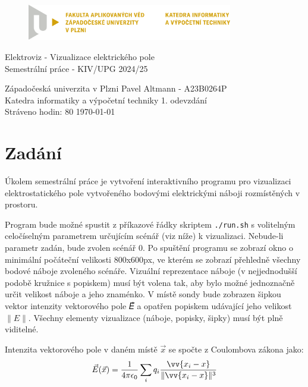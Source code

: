 \documentclass[12pt]{article}
\newcommand{\code}[1]{\texttt{#1}}
\begin{document}
\begin{figure}[H]
	\centering
	\includegraphics[width=0.8\textwidth]{pic/kiv-cmyk-cz}
\end{figure}

\begin{center}
	\vspace{.5cm}
	\LARGE{Elektroviz - Vizualizace elektrického pole}\\
	\large{Semestrální práce - KIV/UPG 2024/25}
\end{center}

\vfill

\noindent
Západočeská univerzita v Plzni \hfill Pavel Altmann - A23B0264P\\
Katedra informatiky a výpočetní techniky \hfill 1. odevzdání\\
Stráveno hodin: 80 \hfill \today
\thispagestyle{empty}

\newpage
\setcounter{page}{1}

\tableofcontents

\newpage

\section{Zadání}

Úkolem semestrální práce je vytvoření interaktivního programu pro vizualizaci
elektrostatického pole vytvořeného bodovými elektrickými náboji rozmístěných v
prostoru.

Program bude možné spustit z příkazové řádky skriptem \code{./run.sh} s
volitelným celočíselným parametrem určujícím scénář (viz níže) k vizualizaci.
Nebude-li parametr zadán, bude zvolen scénář 0. Po spuštění programu se zobrazí
okno o minimální počáteční velikosti 800x600px, ve kterém se zobrazí přehledně
všechny bodové náboje zvoleného scénáře. Vizuální reprezentace náboje (v
nejjednodušší podobě kružnice s popiskem) musí být volena tak, aby bylo možné
jednoznačně určit velikost náboje a jeho znaménko. V místě sondy bude zobrazen
šipkou vektor intenzity vektorového pole 𝐸⃗ a opatřen popiskem udávající jeho
velikost $\|E\|$. Všechny elementy vizualizace (náboje, popisky, šipky) musí být
plně viditelné.

Intenzita vektorového pole v daném místě $\vec{x}$ se spočte
z Coulombova zákona jako:
\[ \vec{E}(\vec{x}) = \frac{1}{4 \pi \epsilon_0}
\sum_i q_i \frac{\vv{x_i - x}}{\|\vv{x_i - x}\|^3} \]
\end{document}
